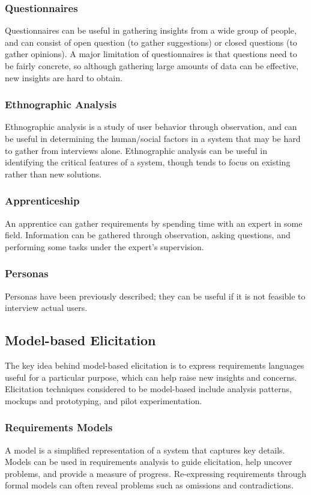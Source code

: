 \documentclass[12pt,titlepage]{article}
\begin{document}
      \subsubsection{Questionnaires}
        Questionnaires can be useful in gathering insights from a wide group of people, and can consist of open question (to gather suggestions) or closed questions
        (to gather opinions). A major limitation of questionnaires is that questions need to be fairly concrete, so although gathering large amounts of data can be
        effective, new insights are hard to obtain.

      \subsubsection{Ethnographic Analysis}
        Ethnographic analysis is a study of user behavior through observation, and can be useful in determining the human/social factors in a system that
        may be hard to gather from interviews alone. Ethnographic analysis can be useful in identifying the critical features of a system, though tends to focus on
        existing rather than new solutions.

      \subsubsection{Apprenticeship}
        An apprentice can gather requirements by spending time with an expert in some field. Information can be gathered through observation, asking questions, and
        performing some tasks under the expert's supervision.

      \subsubsection{Personas}
        Personas have been previously described; they can be useful if it is not feasible to interview actual users.

    \subsection{Model-based Elicitation}
      The key idea behind model-based elicitation is to express requirements languages useful for a particular purpose, which can help raise new insights and concerns.
      Elicitation techniques considered to be model-based include analysis patterns, mockups and prototyping, and pilot experimentation.

      \subsubsection{Requirements Models}
        A model is a simplified representation of a system that captures key details. Models can be used in requirements analysis to guide elicitation, help uncover
        problems, and provide a measure of progress. Re-expressing requirements through formal models can often reveal problems such as omissions and contradictions.
\end{document}
